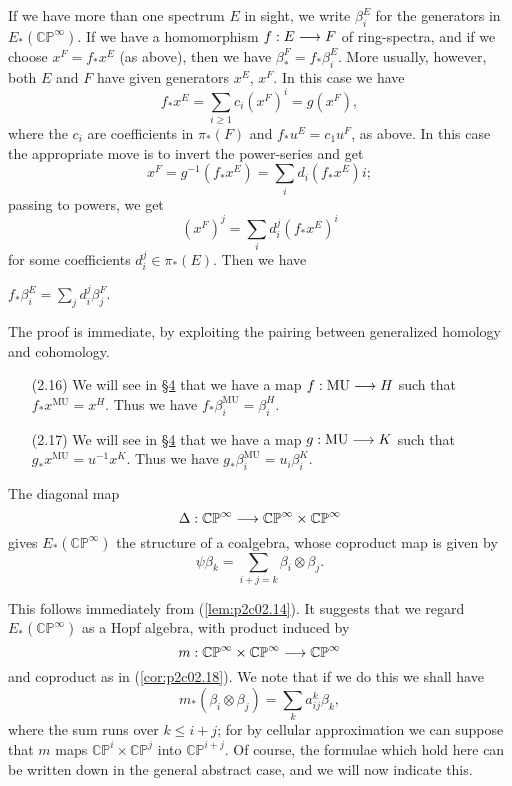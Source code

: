 \documentclass[../main]{subfiles}
\begin{document}
If we have more than one spectrum $E$ in sight, we write $\beta_i^E$ for the generators in $E_\ast(\mathbb {CP}^\infty)$. If we have a homomorphism $f : E \overset{}{\longrightarrow} F$ of ring-spectra, and if we choose $x^F = f_\ast x^E$ (as above), then we have $\beta_\ast^F = f_\ast \beta_i^E$. More usually, however, both $E$ and $F$ have given generators $x^E$, $x^F$. In this case we have $$f_\ast x^E = \sum_{i \ge 1} c_i (x^F)^i = g(x^F),$$ where the $c_i$ are coefficients in $\pi_\ast(F)$ and $f_\ast u^E = c_1 u^F$, as above. In this case the appropriate move is to invert the power-series and get $$x^F = g^{-1}(f_\ast x^E) = \sum_i d_i (f_\ast x^E)i;$$ passing to powers, we get $$(x^F)^j = \sum_i d_i^j (f_\ast x^E)^i$$ for some coefficients $d_i^j \in \pi_\ast(E)$. Then we have

\begin{lemma}
\label{lem:p2c02.15} $\displaystyle f_\ast \beta_i^E = \sum_j d_i^j \beta_j^F.$
\end{lemma}

The proof is immediate, by exploiting the pairing between generalized homology and cohomology.

\begin{examples}
\begin{enumerate}
    \item[(2.16)] We will see in \hyperref[sec:p2c4]{\S 4} that we have a map $f : \mathrm{MU} \overset{}{\longrightarrow} H$ such that $f_\ast x^{\mathrm{MU}} = x^H$. Thus we have $f_\ast \beta_i^{\mathrm{MU}} = \beta_i^H$.
    \item[(2.17)] We will see in \hyperref[sec:p2c4]{\S 4} that we have a map $g : \mathrm{MU} \overset{}{\longrightarrow} K$ such that $g_\ast x^{\mathrm{MU}} = u^{-1} x^K$. Thus we have $g_\ast \beta_i^{\mathrm{MU}} = u_i \beta_i^K$. 
\end{enumerate}
\end{examples}

\begin{corollary}
\label{cor:p2c02.18}
The diagonal map $$\Delta : \mathbb {CP}^\infty \overset{}{\longrightarrow} \mathbb {CP}^\infty \times \mathbb {CP}^\infty$$ gives $E_\ast(\mathbb {CP}^\infty)$ the structure of a coalgebra, whose coproduct map is given by $$\psi \beta_k = \sum_{i + j = k} \beta_i \otimes \beta_j.$$
\end{corollary}

This follows immediately from (\ref{lem:p2c02.14}). It suggests that we regard $E_\ast(\mathbb {CP}^\infty)$ as a Hopf algebra, with product induced by $$m : \mathbb {CP}^\infty \times \mathbb {CP}^\infty \overset{}{\longrightarrow} \mathbb {CP}^\infty$$ and coproduct as in (\ref{cor:p2c02.18}). We note that if we do this we shall have $$m_\ast(\beta_i \otimes \beta_j) = \sum_k a_{ij}^k \beta_k,$$ where the sum runs over $k \le i + j$; for by cellular approximation we can suppose that $m$ maps $\mathbb {CP}^i \times \mathbb {CP}^j$ into $\mathbb {CP}^{i + j}$. Of course, the formulae which hold here can be written down in the general abstract case, and we will now indicate this.  
\end{document}
